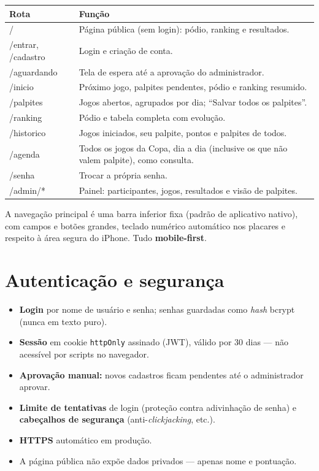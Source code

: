 \documentclass[11pt,a4paper]{article}
\begin{document}
\begin{center}
\begin{tabularx}{\textwidth}{@{}>{\ttfamily}p{2.6cm} L@{}}
\toprule
\normalfont\bfseries Rota & Função \\
\midrule
/ & Página pública (sem login): pódio, ranking e resultados. \\
/entrar, /cadastro & Login e criação de conta. \\
/aguardando & Tela de espera até a aprovação do administrador. \\
/inicio & Próximo jogo, palpites pendentes, pódio e ranking resumido. \\
/palpites & Jogos abertos, agrupados por dia; ``Salvar todos os palpites''. \\
/ranking & Pódio e tabela completa com evolução. \\
/historico & Jogos iniciados, seu palpite, pontos e palpites de todos. \\
/agenda & Todos os jogos da Copa, dia a dia (inclusive os que não valem
palpite), como consulta. \\
/senha & Trocar a própria senha. \\
/admin/* & Painel: participantes, jogos, resultados e visão de palpites. \\
\bottomrule
\end{tabularx}
\end{center}

\noindent A navegação principal é uma barra inferior fixa (padrão de aplicativo
nativo), com campos e botões grandes, teclado numérico automático nos placares
e respeito à área segura do iPhone. Tudo \textbf{mobile-first}.

\section{Autenticação e segurança}

\begin{itemize}
  \item \textbf{Login} por nome de usuário e senha; senhas guardadas como
  \textit{hash} bcrypt (nunca em texto puro).
  \item \textbf{Sessão} em cookie \texttt{httpOnly} assinado (JWT), válido por
  30 dias --- não acessível por scripts no navegador.
  \item \textbf{Aprovação manual:} novos cadastros ficam pendentes até o
  administrador aprovar.
  \item \textbf{Limite de tentativas} de login (proteção contra adivinhação de
  senha) e \textbf{cabeçalhos de segurança} (anti-\textit{clickjacking}, etc.).
  \item \textbf{HTTPS} automático em produção.
  \item A página pública não expõe dados privados --- apenas nome e pontuação.
\end{itemize}
\end{document}
